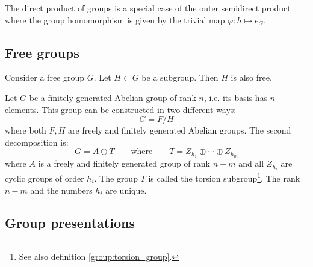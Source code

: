 	\begin{remark}
		The direct product of groups is a special case of the outer semidirect product where the group homomorphism is given by the trivial map $\varphi:h\mapsto e_G$.
	\end{remark}


\subsection{Free groups}

	\begin{property}
		Consider a free group $G$. Let $H\subset G$ be a subgroup. Then $H$ is also free.
	\end{property}
	
	\begin{theorem}\label{group:theorem:free_group}
		Let $G$ be a finitely generated Abelian group of rank $n$, i.e. its basis has $n$ elements. This group can be constructed in two different ways:
		\begin{equation}
			G = F/H
		\end{equation}
		where both $F, H$ are freely and finitely generated Abelian groups. The second decomposition is:
		\begin{equation}
			G = A\oplus T\qquad\text{where}\qquad T = Z_{h_1}\oplus\cdots\oplus Z_{h_m}
		\end{equation}
		where $A$ is a freely and finitely generated group of rank $n-m$ and all $Z_{h_i}$ are cyclic groups of order $h_i$. The group $T$ is called the torsion subgroup\footnote{See also definition \ref{group:torsion_group}.}.	The rank $n-m$ and the numbers $h_i$ are unique.
	\end{theorem}

\subsection{Group presentations}

